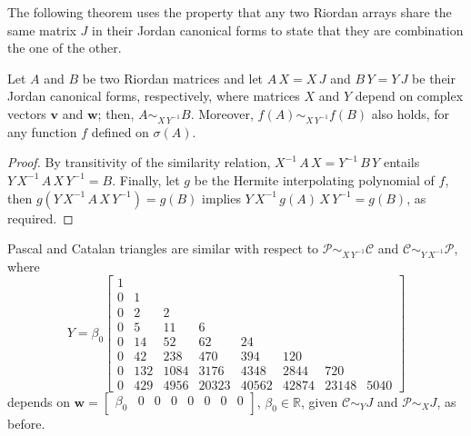 \fi
The following theorem uses the property that any two Riordan arrays
share the same matrix $J$ in their Jordan canonical forms to state that they
are combination the one of the other.

\begin{theorem}
Let $A$ and $B$ be two Riordan matrices and let $A\,X = X\,J$ and $B\,Y= Y\,J$
be their Jordan canonical forms, respectively, where matrices $X$ and $Y$ depend
on complex vectors $\boldsymbol{v}$ and $\boldsymbol{w}$; then, $A
\sim_{X\,Y^{-1}} B$. Moreover, $f(A) \sim_{X\,Y^{-1}} f(B)$ also holds, for any
function $f$ defined on $\sigma(A)$.
\end{theorem}
\begin{proof}
By transitivity of the similarity relation, $X^{-1}\,A\,X = Y^{-1}\,B\,Y$
entails $Y\,X^{-1}\,A\,X\,Y^{-1} = B$. Finally, let $g$ be the Hermite
interpolating polynomial of $f$, then $g(Y\,X^{-1}\,A\,X\,Y^{-1}) = g(B)$
implies $Y\,X^{-1}\,g(A)\,X\,Y^{-1} = g(B)$, as required.
\end{proof}

\vfill

\begin{example}
Pascal and Catalan triangles are similar with respect to
$\mathcal{P} \sim_{X\,Y^{-1}}\mathcal{C}$ and $\mathcal{C}
\sim_{Y\,X^{-1}}\mathcal{P}$, where
\begin{displaymath}
Y = \beta_{0} \left[\begin{matrix}1 &  &  &  &  &  &  & \\0 & 1 &  &  &  &  &  & \\0 & 2 & 2 &  &  &  &  & \\0 & 5 & 11 & 6 &  &  &  & \\0 & 14 & 52 & 62 & 24 &  &  & \\0 & 42 & 238 & 470 & 394 & 120 &  & \\0 & 132 & 1084 & 3176 & 4348 & 2844 & 720 & \\0 & 429 & 4956 & 20323 & 40562 & 42874 & 23148 & 5040\end{matrix}\right]
\end{displaymath}
depends on $\displaystyle\boldsymbol{w}= \left[\begin{matrix} \beta_{0} & 0 & 0 & 0 & 0 & 0 & 0 & 0 \end{matrix}\right]$, $\beta_{0}\in\mathbb{R}$,
given $\mathcal{C}\sim_{Y}J$ and $\mathcal{P}\sim_{X}J$, as before.
\end{example}


